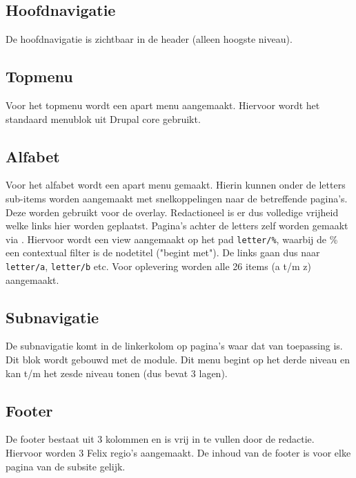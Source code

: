 
\subsection{Hoofdnavigatie}

De hoofdnavigatie is zichtbaar in de header (alleen hoogste niveau).

\subsection{Topmenu}

Voor het topmenu wordt een apart menu aangemaakt. Hiervoor wordt het standaard menublok uit Drupal core gebruikt.

\subsection{Alfabet}

Voor het alfabet wordt een apart menu gemaakt. Hierin kunnen onder de letters sub-items worden aangemaakt met snelkoppelingen naar de betreffende pagina's. Deze worden gebruikt voor de overlay. Redactioneel is er dus volledige vrijheid welke links hier worden geplaatst. Pagina's achter de letters zelf worden gemaakt via . Hiervoor wordt een view aangemaakt op het pad \texttt{letter/\%}, waarbij de \% een contextual filter is de nodetitel ("begint met"). De links gaan dus naar \texttt{letter/a}, \texttt{letter/b} etc. Voor oplevering worden alle	 26 items (a t/m z) aangemaakt.

\subsection{Subnavigatie}

De subnavigatie komt in de linkerkolom op pagina's waar dat van toepassing is. Dit blok wordt gebouwd met de  module. Dit menu begint op het derde niveau en kan t/m het zesde niveau tonen (dus bevat 3 lagen).

\subsection{Footer}

De footer bestaat uit 3 kolommen en is vrij in te vullen door de redactie. Hiervoor worden 3 Felix regio's aangemaakt. De inhoud van de footer is voor elke pagina van de subsite gelijk.

